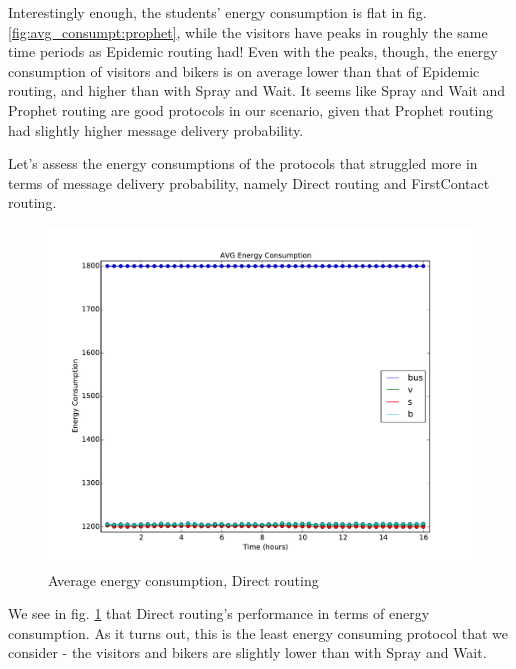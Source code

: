 \documentclass[conference]{IEEEtran}
\begin{document}
Interestingly enough, the students' energy consumption is flat in fig. \ref{fig:avg_consumpt:prophet}, while the visitors have peaks in roughly the same time periods as Epidemic routing had! Even with the peaks, though, the energy consumption of visitors and bikers is on average lower than that of Epidemic routing, and higher than with Spray and Wait. It seems like Spray and Wait and Prophet routing are good protocols in our scenario, given that Prophet routing had slightly higher message delivery probability.

Let's assess the energy consumptions of the protocols that struggled more in terms of message delivery probability, namely Direct routing and FirstContact routing.

\begin{figure}
  \includegraphics[scale=0.25, center]{../one_1.5.1-RC2/plots/Direct_AVG_ENERGY_CONSUMPTION.pdf}
  \caption{Average energy consumption, Direct routing}
  \label{fig:avg_consumpt:direct}
\end{figure}

We see in fig. \ref{fig:avg_consumpt:direct} that Direct routing's performance in terms of energy consumption. As it turns out, this is the least energy consuming protocol that we consider - the visitors and bikers are slightly lower than with Spray and Wait.
\end{document}
